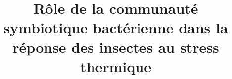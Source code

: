 \documentclass[%
	a4paper,
	11pt,
	linktocpage=true,
	oneside,
	DIV=calc, 
	]{scrreprt}
\title{Rôle de la communauté symbiotique bactérienne dans la réponse des insectes au stress thermique}
\begin{document}
\nocite{*}

	\maketitle
	
	\tableofcontents

	

	
\printbibliography
\end{document}
